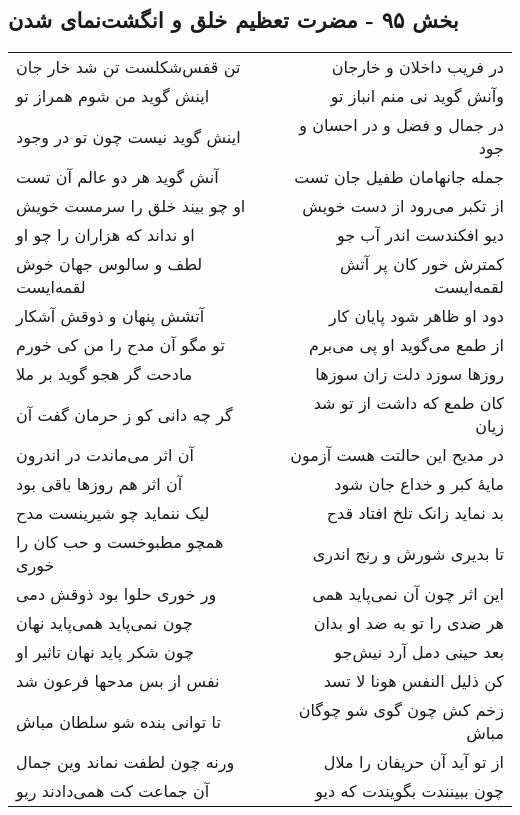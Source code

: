 \begin{center}
\section*{بخش ۹۵ - مضرت تعظیم خلق و انگشت‌نمای شدن}
\label{sec:sh095}
\begin{longtable}{l p{0.5cm} r}
تن قفس‌شکلست تن شد خار جان
&&
در فریب داخلان و خارجان
\\
اینش گوید من شوم همراز تو
&&
وآنش گوید نی منم انباز تو
\\
اینش گوید نیست چون تو در وجود
&&
در جمال و فضل و در احسان و جود
\\
آنش گوید هر دو عالم آن تست
&&
جمله جانهامان طفیل جان تست
\\
او چو بیند خلق را سرمست خویش
&&
از تکبر می‌رود از دست خویش
\\
او نداند که هزاران را چو او
&&
دیو افکندست اندر آب جو
\\
لطف و سالوس جهان خوش لقمه‌ایست
&&
کمترش خور کان پر آتش لقمه‌ایست
\\
آتشش پنهان و ذوقش آشکار
&&
دود او ظاهر شود پایان کار
\\
تو مگو آن مدح را من کی خورم
&&
از طمع می‌گوید او پی می‌برم
\\
مادحت گر هجو گوید بر ملا
&&
روزها سوزد دلت زان سوزها
\\
گر چه دانی کو ز حرمان گفت آن
&&
کان طمع که داشت از تو شد زیان
\\
آن اثر می‌ماندت در اندرون
&&
در مدیح این حالتت هست آزمون
\\
آن اثر هم روزها باقی بود
&&
مایهٔ کبر و خداع جان شود
\\
لیک ننماید چو شیرینست مدح
&&
بد نماید زانک تلخ افتاد قدح
\\
همچو مطبوخست و حب کان را خوری
&&
تا بدیری شورش و رنج اندری
\\
ور خوری حلوا بود ذوقش دمی
&&
این اثر چون آن نمی‌پاید همی
\\
چون نمی‌پاید همی‌پاید نهان
&&
هر ضدی را تو به ضد او بدان
\\
چون شکر پاید نهان تاثیر او
&&
بعد حینی دمل آرد نیش‌جو
\\
نفس از بس مدحها فرعون شد
&&
کن ذلیل النفس هونا لا تسد
\\
تا توانی بنده شو سلطان مباش
&&
زخم کش چون گوی شو چوگان مباش
\\
ورنه چون لطفت نماند وین جمال
&&
از تو آید آن حریفان را ملال
\\
آن جماعت کت همی‌دادند ریو
&&
چون ببینندت بگویندت که دیو
\\

\end{longtable}
\end{center}
